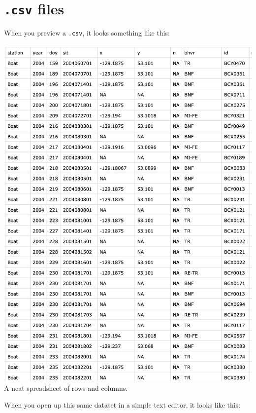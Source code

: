 \documentclass[
]{book}
\begin{document}
\hypertarget{csv-files}{%
\section*{\texorpdfstring{\texttt{.csv} files}{.csv files}}\label{csv-files}}

When you preview a \texttt{.csv}, it looks something like this:

\includegraphics{img/csv.png}
A neat spreadsheet of rows and columns.

When you open up this same dataset in a simple text editor, it looks like this:
\end{document}
